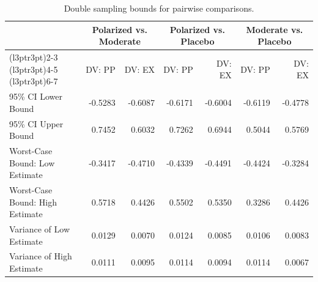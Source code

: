 \begin{table}

\caption{Double sampling bounds for pairwise comparisons.}
\centering
\begin{tabular}[t]{lrrrrrr}
\toprule
\multicolumn{1}{c}{ } & \multicolumn{2}{c}{Polarized vs. Moderate} & \multicolumn{2}{c}{Polarized vs. Placebo} & \multicolumn{2}{c}{Moderate vs. Placebo} \\
\cmidrule(l{3pt}r{3pt}){2-3} \cmidrule(l{3pt}r{3pt}){4-5} \cmidrule(l{3pt}r{3pt}){6-7}
 & DV: PP & DV: EX & DV: PP & DV: EX & DV: PP & DV: EX\\
\midrule
95\% CI Lower Bound & -0.5283 & -0.6087 & -0.6171 & -0.6004 & -0.6119 & -0.4778\\
95\% CI Upper Bound & 0.7452 & 0.6032 & 0.7262 & 0.6944 & 0.5044 & 0.5769\\
Worst-Case Bound: Low Estimate & -0.3417 & -0.4710 & -0.4339 & -0.4491 & -0.4424 & -0.3284\\
Worst-Case Bound: High Estimate & 0.5718 & 0.4426 & 0.5502 & 0.5350 & 0.3286 & 0.4426\\
Variance of Low Estimate & 0.0129 & 0.0070 & 0.0124 & 0.0085 & 0.0106 & 0.0083\\
\addlinespace
Variance of High Estimate & 0.0111 & 0.0095 & 0.0114 & 0.0094 & 0.0114 & 0.0067\\
\bottomrule
\end{tabular}
\end{table}
